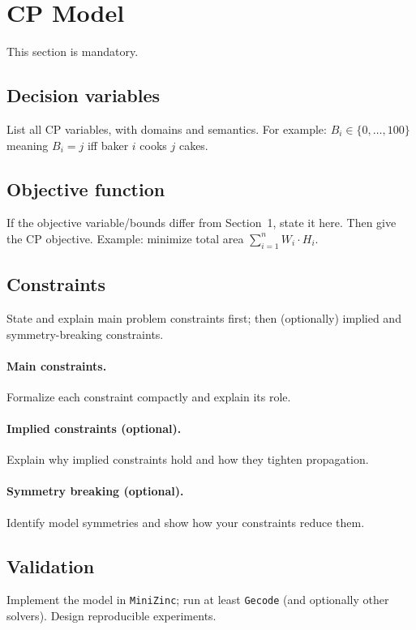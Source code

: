 \documentclass{article}
\begin{document}
\section{CP Model}
This section is mandatory.

\subsection{Decision variables}
List all CP variables, with domains and semantics.
For example: $B_i \in \{0,\dots,100\}$ meaning $B_i = j$ iff baker $i$ cooks $j$ cakes.

\subsection{Objective function}
If the objective variable/bounds differ from Section~1, state it here.
Then give the CP objective. Example: minimize total area
$ \sum_{i=1}^{n} W_i \cdot H_i $.

\subsection{Constraints}
State and explain main problem constraints first; then (optionally) implied and symmetry-breaking constraints.

\paragraph{Main constraints.}
Formalize each constraint compactly and explain its role.

\paragraph{Implied constraints (optional).}
Explain why implied constraints hold and how they tighten propagation.

\paragraph{Symmetry breaking (optional).}
Identify model symmetries and show how your constraints reduce them.

\subsection{Validation}
Implement the model in \texttt{MiniZinc}; run at least \texttt{Gecode}
(and optionally other solvers). Design reproducible experiments.
\end{document}
